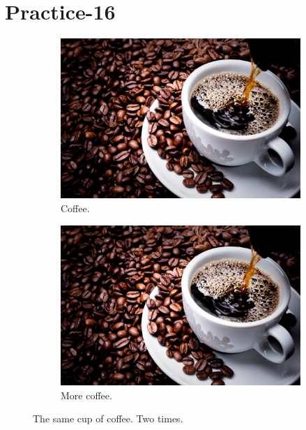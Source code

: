 \documentclass{article}
\begin{document}
\section{Practice-16}
	\begin{figure}[h!]
	\centering
	\begin{subfigure}[b]{0.4\linewidth}
		\includegraphics[width=\linewidth]{coffe.jpg}
		\caption{Coffee.}
	\end{subfigure}
	\begin{subfigure}[b]{0.4\linewidth}
		
		\includegraphics[width=\linewidth]{coffe.jpg}
		\caption{More coffee.}
	\end{subfigure}
	\caption{The same cup of coffee. Two times.}
	\label{fig:coffee}
\end{figure}
\end{document}
